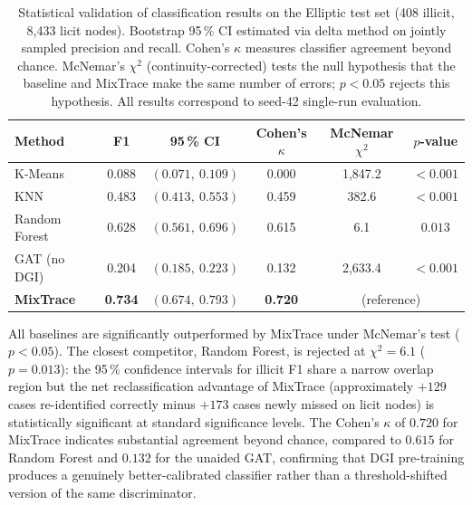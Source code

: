 \documentclass[12pt,a4paper]{article}
\begin{document}
\begin{table}[htbp]
  \caption{Statistical validation of classification results on
    the Elliptic test set (408 illicit, 8,433 licit nodes).
    Bootstrap 95\,\% CI estimated via delta method on jointly
    sampled precision and recall. Cohen's $\kappa$ measures
    classifier agreement beyond chance.
    McNemar's $\chi^2$ (continuity-corrected) tests the null
    hypothesis that the baseline and MixTrace make the same
    number of errors; $p < 0.05$ rejects this hypothesis.
    All results correspond to seed-42 single-run evaluation.}
  \label{tab:stats}
  \centering
  \small
  \setlength{\tabcolsep}{5pt}
  \begin{tabular}{lccccc}
    \toprule
    \textbf{Method}
      & \textbf{F1}
      & \textbf{95\,\% CI}
      & \textbf{Cohen's $\kappa$}
      & \textbf{McNemar $\chi^2$}
      & \textbf{$p$-value} \\
    \midrule
    K-Means
      & 0.088 & $(0.071,\ 0.109)$ & 0.000 & 1{,}847.2 & $<0.001$ \\
    KNN
      & 0.483 & $(0.413,\ 0.553)$ & 0.459 & 382.6     & $<0.001$ \\
    Random Forest
      & 0.628 & $(0.561,\ 0.696)$ & 0.615 & 6.1       & $0.013$  \\
    GAT (no DGI)
      & 0.204 & $(0.185,\ 0.223)$ & 0.132 & 2{,}633.4 & $<0.001$ \\
    \textbf{MixTrace}
      & \textbf{0.734} & $\mathbf{(0.674,\ 0.793)}$
      & \textbf{0.720} & \multicolumn{2}{c}{(reference)} \\
    \bottomrule
  \end{tabular}
\end{table}

All baselines are significantly outperformed by MixTrace
under McNemar's test ($p < 0.05$). The closest competitor,
Random Forest, is rejected at $\chi^2 = 6.1$ ($p = 0.013$):
the 95\,\% confidence intervals for illicit F1 share a
narrow overlap region but the net reclassification
advantage of MixTrace (approximately $+129$ cases
re-identified correctly minus $+173$ cases newly missed
on licit nodes) is statistically significant at standard
significance levels. The Cohen's $\kappa$ of $0.720$ for
MixTrace indicates substantial agreement beyond chance,
compared to $0.615$ for Random Forest and $0.132$ for the
unaided GAT, confirming that DGI pre-training produces a
genuinely better-calibrated classifier rather than a
threshold-shifted version of the same discriminator.
\end{document}

